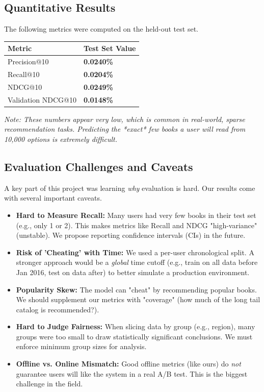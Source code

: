 \documentclass[11pt,a4paper]{article}
\newcommand{\Pten}{0.0240\%}
\newcommand{\Rten}{0.0204\%}
\newcommand{\NDCGten}{0.0249\%}
\newcommand{\ValNDCGten}{0.0148\%}
\begin{document}
\subsection*{Quantitative Results}
The following metrics were computed on the held-out test set.
\begin{center}
\begin{tabular}{@{}l l@{}}\toprule
Metric & Test Set Value \\ \midrule
Precision@10 & \textbf{\Pten} \\
Recall@10 & \textbf{\Rten} \\
NDCG@10 & \textbf{\NDCGten} \\ \midrule
Validation NDCG@10 & \textbf{\ValNDCGten} \\ \bottomrule
\end{tabular}
\end{center}
\emph{Note: These numbers appear very low, which is common in real-world, sparse recommendation tasks. Predicting the *exact* few books a user will read from 10,000 options is extremely difficult.}

\subsection*{Evaluation Challenges and Caveats}
A key part of this project was learning \emph{why} evaluation is hard. Our results come with several important caveats.
\begin{itemize}
  \item \textbf{Hard to Measure Recall:} Many users had very few books in their test set (e.g., only 1 or 2). This makes metrics like Recall and NDCG "high-variance" (unstable). We propose reporting confidence intervals (CIs) in the future.
  \item \textbf{Risk of 'Cheating' with Time:} We used a per-user chronological split. A stronger approach would be a \emph{global} time cutoff (e.g., train on all data before Jan 2016, test on data after) to better simulate a production environment.
  \item \textbf{Popularity Skew:} The model can "cheat" by recommending popular books. We should supplement our metrics with "coverage" (how much of the long tail catalog is recommended?).
  \item \textbf{Hard to Judge Fairness:} When slicing data by group (e.g., region), many groups were too small to draw statistically significant conclusions. We must enforce minimum group sizes for analysis.
  \item \textbf{Offline vs. Online Mismatch:} Good offline metrics (like ours) do \emph{not} guarantee users will like the system in a real A/B test. This is the biggest challenge in the field.
\end{itemize}
\end{document}
